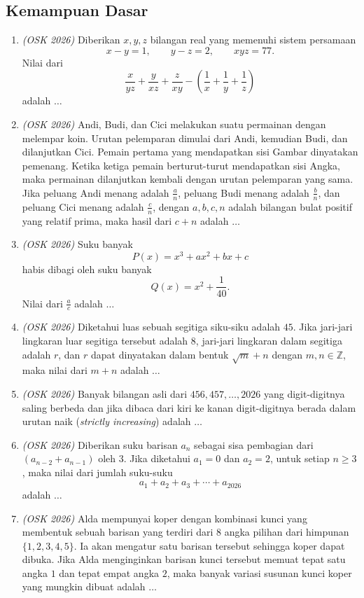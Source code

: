 \subsection{Kemampuan Dasar}
\begin{enumerate}
	\item \textit{(OSK 2026)} Diberikan $x,y,z$ bilangan real yang memenuhi sistem persamaan
	\[
	x-y=1,\qquad
	y-z=2,\qquad
	xyz=77.
	\]
	Nilai dari
	\[
	\frac{x}{yz}+\frac{y}{xz}+\frac{z}{xy}
	-\left(\frac1x+\frac1y+\frac1z\right)
	\]
	adalah $\ldots$
	
	\item \textit{(OSK 2026)} Andi, Budi, dan Cici melakukan suatu permainan dengan melempar koin. Urutan pelemparan dimulai dari Andi, kemudian Budi, dan dilanjutkan Cici. Pemain pertama yang mendapatkan sisi Gambar dinyatakan pemenang. Ketika ketiga pemain berturut-turut mendapatkan sisi Angka, maka permainan dilanjutkan kembali dengan urutan pelemparan yang sama. Jika peluang Andi menang adalah $\frac{a}{n}$, peluang Budi menang adalah $\frac{b}{n}$, dan peluang Cici menang adalah $\frac{c}{n}$, dengan $a,b,c,n$ adalah bilangan bulat positif yang relatif prima, maka hasil dari $c+n$ adalah $\ldots$
	
	\item \textit{(OSK 2026)} Suku banyak
	\[
	P(x)=x^3+ax^2+bx+c
	\]
	habis dibagi oleh suku banyak
	\[
	Q(x)=x^2+\frac1{40}.
	\]
	Nilai dari $\frac{a}{c}$ adalah $\ldots$
	
	\item \textit{(OSK 2026)} Diketahui luas sebuah segitiga siku-siku adalah $45$. Jika jari-jari lingkaran luar segitiga tersebut adalah $8$, jari-jari lingkaran dalam segitiga adalah $r$, dan $r$ dapat dinyatakan dalam bentuk $\sqrt{m}+n$ dengan $m,n\in\mathbb Z$, maka nilai dari $m+n$ adalah $\ldots$
	
	\item \textit{(OSK 2026)} Banyak bilangan asli dari $456,457,\ldots,2026$ yang digit-digitnya saling berbeda dan jika dibaca dari kiri ke kanan digit-digitnya berada dalam urutan naik (\textit{strictly increasing}) adalah $\ldots$
	
	\item \textit{(OSK 2026)} Diberikan suku barisan $a_n$ sebagai sisa pembagian dari $(a_{n-2}+a_{n-1})$ oleh $3$. Jika diketahui $a_1=0$ dan $a_2=2$, untuk setiap $n\ge3$, maka nilai dari jumlah suku-suku
	\[
	a_1+a_2+a_3+\cdots+a_{2026}
	\]
	adalah $\ldots$
	
	\item \textit{(OSK 2026)} Alda mempunyai koper dengan kombinasi kunci yang membentuk sebuah barisan yang terdiri dari $8$ angka pilihan dari himpunan $\{1,2,3,4,5\}$. Ia akan mengatur satu barisan tersebut sehingga koper dapat dibuka. Jika Alda menginginkan barisan kunci tersebut memuat tepat satu angka $1$ dan tepat empat angka $2$, maka banyak variasi susunan kunci koper yang mungkin dibuat adalah $\ldots$
	

\end{enumerate}
